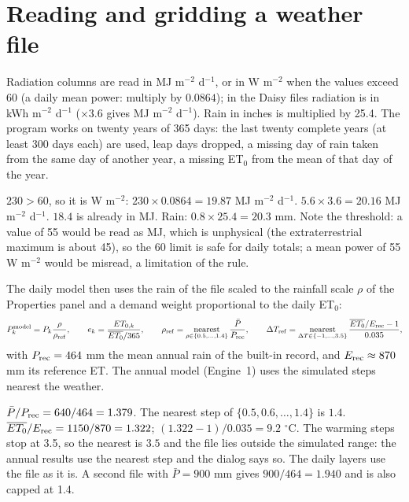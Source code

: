 \section{Reading and gridding a weather file}
Radiation columns are read in MJ m$^{-2}$ d$^{-1}$, or in W m$^{-2}$ when the values exceed 60 (a daily mean power: multiply by $0.0864$); in the Daisy files radiation is in kWh m$^{-2}$ d$^{-1}$ ($\times3.6$ gives MJ m$^{-2}$ d$^{-1}$). Rain in inches is multiplied by 25.4. The program works on twenty years of 365 days: the last twenty complete years (at least 300 days each) are used, leap days dropped, a missing day of rain taken from the same day of another year, a missing ET$_0$ from the mean of that day of the year.

\sol  $230>60$, so it is W m$^{-2}$: $230\times0.0864=19.87$ MJ m$^{-2}$ d$^{-1}$. $5.6\times3.6=20.16$ MJ m$^{-2}$ d$^{-1}$. $18.4$ is already in MJ. Rain: $0.8\times25.4=20.3$ mm. Note the threshold: a value of 55 would be read as MJ, which is unphysical (the extraterrestrial maximum is about 45), so the 60 limit is safe for daily totals; a mean power of 55 W m$^{-2}$ would be misread, a limitation of the rule.


The daily model then uses the rain of the file scaled to the rainfall scale $\rho$ of the Properties panel and a demand weight proportional to the daily ET$_0$:
\begin{equation}P_k^{\rm model}=P_k\frac{\rho}{\rho_{\rm ref}},\qquad e_k=\frac{ET_{0,k}}{\overline{ET_0}/365},\qquad\rho_{\rm ref}=\mathop{\mathrm{nearest}}_{\rho\in\{0.5,\dots,1.4\}}\frac{\bar P}{P_{\rm rec}},\qquad\Delta T_{\rm ref}=\mathop{\mathrm{nearest}}_{\Delta T\in\{-1,\dots,3.5\}}\frac{\overline{ET_0}/E_{\rm rec}-1}{0.035},\end{equation}
with $P_{\rm rec}=464$ mm the mean annual rain of the built-in record, and $E_{\rm rec}\approx870$ mm its reference ET. The annual model (Engine~1) uses the simulated steps nearest the weather.

\sol  $\bar P/P_{\rm rec}=640/464=1.379$. The nearest step of $\{0.5,0.6,\dots,1.4\}$ is $1.4$. $\overline{ET_0}/E_{\rm rec}=1150/870=1.322$; $(1.322-1)/0.035=9.2$ $^\circ$C. The warming steps stop at 3.5, so the nearest is $3.5$ and the file lies outside the simulated range: the annual results use the nearest step and the dialog says so. The daily layers use the file as it is. A second file with $\bar P=900$ mm gives $900/464=1.940$ and is also capped at 1.4.


